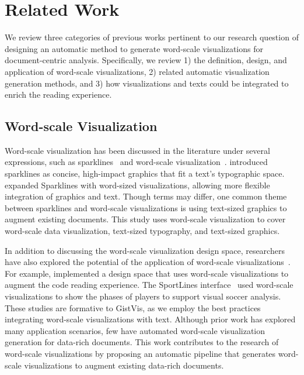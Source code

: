 \section{Related Work}
We review three categories of previous works pertinent to our research question of designing an automatic method to generate word-scale visualizations for document-centric analysis. Specifically, we review 1) the definition, design, and application of word-scale visualizations, 2) related automatic visualization generation methods, and 3) how visualizations and texts could be integrated to enrich the reading experience.

\subsection{Word-scale Visualization}
Word-scale visualization has been discussed in the literature under several expressions, such as sparklines~\cite{tufte2006beautiful} and word-scale visualization~\cite{goffin2014exploring}.
\citet{tufte2006beautiful} introduced sparklines as concise, high-impact graphics that fit a text's typographic space. \citet{goffin2014exploring, goffin2017Exploratory} expanded Sparklines with word-sized visualizations, allowing more flexible integration of graphics and text.
Though terms may differ, one common theme between sparklines and word-scale visualizations is using text-sized graphics to augment existing documents. This study uses word-scale visualization to cover word-scale data visualization, text-sized typography, and text-sized graphics. 

In addition to discussing the word-scale visualization design space, researchers have also explored the potential of the application of word-scale visualizations~\cite{hoffswell2018Augmenting, perin2013soccerstories, brandes2013gestaltlines, beck2016visual}. For example, \citet{hoffswell2018Augmenting} implemented a design space that uses word-scale visualizations to augment the code reading experience. The SportLines interface~\cite{perin2013soccerstories} used word-scale visualizations to show the phases of players to support visual soccer analysis. These studies are formative to GistVis, as we employ the best practices integrating word-scale visualizations with text. Although prior work has explored many application scenarios, few have automated word-scale visualization generation for data-rich documents. This work contributes to the research of word-scale visualizations by proposing an automatic pipeline that generates word-scale visualizations to augment existing data-rich documents.

